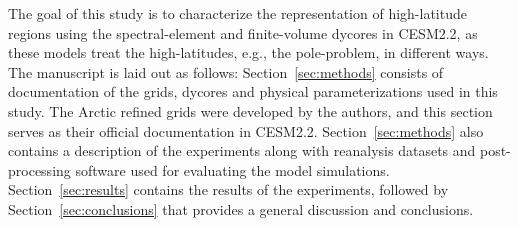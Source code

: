 \documentclass[draft]{agujournal2019}
\begin{document}
The goal of this study is to characterize the representation of high-latitude regions using the spectral-element and finite-volume dycores in CESM2.2, as these models treat the high-latitudes, e.g., the pole-problem, in different ways. The manuscript is laid out as follows: Section~\ref{sec:methods} consists of documentation of the grids, dycores and physical parameterizations used in this study. The Arctic refined grids were developed by the authors, and this section serves as their official documentation in CESM2.2. Section~\ref{sec:methods} also contains a description of the experiments along with reanalysis datasets and post-processing software used for evaluating the model simulations. Section~\ref{sec:results} contains the results of the experiments, followed by Section~\ref{sec:conclusions} that provides a general discussion and conclusions.
\end{document}
